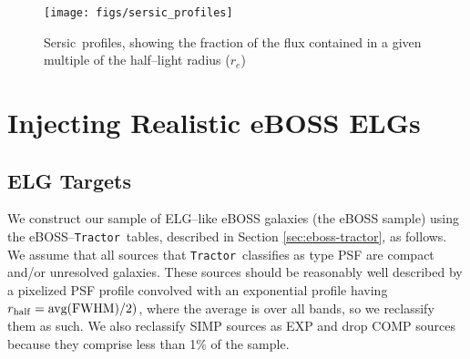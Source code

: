 \documentclass[a4paper,fleqn,usenatbib]{mnras}
\newcommand{\rhalf}{r_{\rm{half}}}
\newcommand{\tractor}{{\tt Tractor}}
\newcommand{\sersic}{Sersic}
\begin{document}
\begin{figure}
\begin{center}
 \texttt{[image: figs/sersic\_profiles]}
\end{center}
 \caption[\sersic\, Profiles]{\sersic\, profiles, showing the fraction of the flux contained in a given multiple of the half--light radius ($r_e$)}
 \label{fig:sersic-profiles}
\end{figure}



\section{Injecting Realistic eBOSS ELGs}

\subsection{ELG Targets}
\label{sec:input-sample}

We construct our sample of ELG--like eBOSS galaxies (the eBOSS sample) using the eBOSS--\tractor\, tables, described in Section \ref{sec:eboss-tractor}, as follows. We assume that all sources that \tractor \, classifies as type PSF are compact and/or unresolved galaxies. These sources should be reasonably well described by a pixelized PSF profile convolved with an exponential profile having $\rhalf = \text{avg}(\text{FWHM}) / 2)$, where the average is over all bands, so we reclassify them as such. We also reclassify SIMP sources as EXP and drop COMP sources because they comprise less than 1\% of the sample. 
\end{document}
